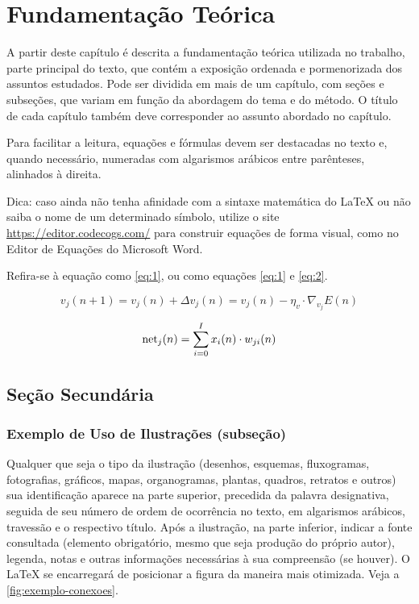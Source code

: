 \chapter{Fundamentação Teórica}

A partir deste capítulo é descrita a fundamentação teórica utilizada no trabalho, parte principal do texto, que contém a exposição ordenada e pormenorizada dos assuntos estudados. Pode ser dividida em mais de um capítulo, com seções e subseções, que variam em função da abordagem do tema e do método. O título de cada capítulo também deve corresponder ao assunto abordado no capítulo.

Para facilitar a leitura, equações e fórmulas devem ser destacadas no texto e, quando necessário, numeradas com algarismos arábicos entre parênteses, alinhados à direita.

Dica: caso ainda não tenha afinidade com a sintaxe matemática do \LaTeX{} ou não saiba o nome de um determinado símbolo, utilize o site \url{https://editor.codecogs.com/} para construir equações de forma visual, como no Editor de Equações do Microsoft Word.

Refira-se à equação como \autoref{eq:1}, ou como equações \ref{eq:1} e \ref{eq:2}.

\begin{equation}\label{eq:1}
    v_j(n+1) = v_j(n) + \Delta v_j(n) =  v_j(n) - \eta_v\cdot\nabla_{v_j}E(n)
\end{equation}

\begin{equation}\label{eq:2}
    \text{net}_j(n) = \sum_{i = 0}^{I} x_i(n) \cdot w_{ji}(n)\\
\end{equation}


\section{Seção Secundária}

\subsection{Exemplo de Uso de Ilustrações (subseção)}

Qualquer que seja o tipo da ilustração (desenhos, esquemas, fluxogramas, fotografias, gráficos, mapas, organogramas, plantas, quadros, retratos e outros) sua identificação aparece na parte superior, precedida da palavra designativa, seguida de seu número de ordem de ocorrência no texto, em algarismos arábicos, travessão e o respectivo título. Após a ilustração, na parte inferior, indicar a fonte consultada (elemento obrigatório, mesmo que seja produção do próprio autor), legenda, notas e outras informações necessárias à sua compreensão (se houver). O \LaTeX{} se encarregará de posicionar a figura da maneira mais otimizada. Veja a \autoref{fig:exemplo-conexoes}.

